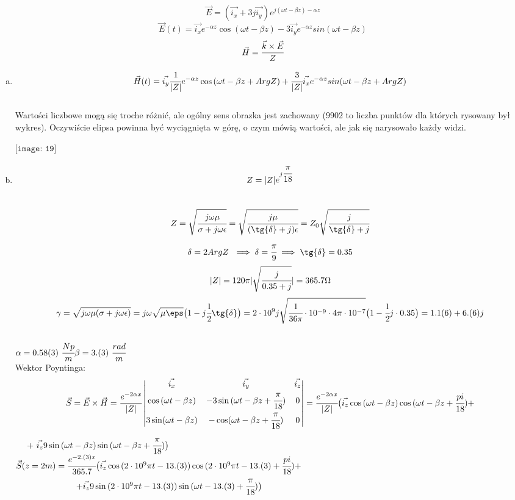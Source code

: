 \begin{solution}
$$\vec{E}=(\vec{i_{x}}+3j\vec{i_{y}})e^{j(\omega t - \beta z)- \alpha z}$$
$$\vec{E}(t)=\vec{i_{x}}e^{-\alpha z}\cos(\omega t - \beta z)-3\vec{i_{y}}e^{-\alpha z}sin(\omega t - \beta z)$$
$$\vec{H}=\cfrac{\vec{k}\times\vec{E}}{Z}$$
\begin{enumerate}[a)]
\item $$\vec{H}(t)=\vec{i_{y}}\cfrac{1}{|Z|}e^{-\alpha z}\cos{(\omega t - \beta z + Arg Z)+\cfrac{3}{|Z|}\vec{i_{x}}e^{-\alpha z}sin(\omega t - \beta z + Arg Z)}$$\\
Wartości liczbowe mogą się troche różnić, ale ogólny sens obrazka jest zachowany (9902 to liczba punktów dla których rysowany był wykres). Oczywiście elipsa powinna być wyciągnięta w górę, o czym mówią wartości, ale jak się narysowało każdy widzi.
\begin{center}
$\texttt{[image: 19]}$\\
\end{center}
\item $$Z=|Z|e^{j\cfrac{\pi}{18}}$$\\
$$Z=\sqrt{\cfrac{j\omega \mu}{\sigma + j\omega\epsilon}}=\sqrt{\cfrac{j\mu}{(\tg{\delta}+j)\epsilon}}=Z_{0}\sqrt{\cfrac{j}{\tg{\delta}+j}}$$
$$\delta = 2Arg Z\ \implies \delta = \cfrac{\pi}{9} \implies \tg{\delta}=0.35$$
$$|Z|=120\pi|\sqrt{\cfrac{j}{0.35+j}}|=365.7 \Omega$$
$$\gamma= \sqrt{j \omega\mu( \sigma+j \omega \epsilon)} = j \omega \sqrt{ \mu\eps} \big{(} 1 - j \cfrac{1}{2} \tg{ \delta}  \big{)} = 
2\cdot 10^{9}j\sqrt{\cfrac{1}{36\pi}\cdot 10^{-9}\cdot 4\pi\cdot 10^{-7}}\big{(} 1-\cfrac{1}{2}j\cdot 0.35 \big{)}=1.1(6)+ 6.(6)j$$\\
$\alpha=0.58(3) \ \cfrac{Np}{m}\\ \beta=3.(3)\ \cfrac{rad}{m} $\\
Wektor Poyntinga:
$$\vec{S}=\vec{E}\times\vec{H} =\cfrac{e^{-2\alpha x}}{|Z|} \begin{vmatrix}
					\vec{i_{x}}&\vec{i_{y}}&\vec{i_{z}}\\
					\cos{(\omega t-\beta z)}&-3\sin{(\omega t-\beta z+\cfrac{\pi}{18})}&0\\
					3\sin(\omega t - \beta z)&-\cos(\omega t - \beta z+\cfrac{\pi}{18})&0\end{vmatrix}=\cfrac{e^{-2\alpha x}}{|Z|} \big{(} \vec{i_{z}}\cos{(\omega t -\beta z)}\cos{(\omega t -\beta z + \cfrac{pi}{18})}+$$  $\ \ \ \ +\ \vec{i_{z}} 9\sin{(\omega t - \beta z)}\sin{(\omega t - \beta z+\cfrac{\pi}{18})} \big{)} $\\
$ \vec{S}(z=2m)=\cfrac{e^{-2.(3) x}}{365.7} \big{(} \vec{i_{z}}\cos{(2\cdot 10^{9} \pi t -13.(3))}\cos{(2\cdot 10^{9} \pi t -13.(3) + \cfrac{pi}{18})}+$\\ $\hspace{2.5cm} +\vec{i_{z}} 9\sin{(2\cdot 10^{9} \pi t - 13.(3))}\sin{(\omega t - 13.(3) +\cfrac{\pi}{18})} \big{)} $

\end{enumerate}
\end{solution}
